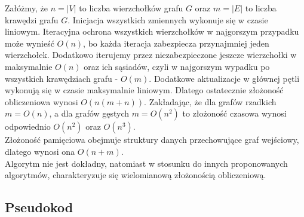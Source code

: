     Załóżmy, że $n = |V|$ to liczba wierzchołków grafu $G$ oraz $m = |E|$ to liczba krawędzi grafu $G$. 
    Inicjacja wszystkich zmiennych wykonuje się w czasie liniowym. Iteracyjna ochrona wszystkich wierzchołków w najgorszym przypadku może wynieść $O(n)$, bo każda iteracja zabezpiecza przynajmniej jeden wierzchołek. Dodatkowo iterujemy przez niezabezpieczone jeszcze wierzchołki w maksymalnie $O(n)$ oraz ich sąsiadów, czyli w najgorszym wypadku po wszystkich krawędziach grafu - $O(m)$. Dodatkowe aktualizacje w głównej pętli wykonują się w czasie maksymalnie liniowym. Dlatego ostatecznie złożoność obliczeniowa wynosi $O(n(m+n))$. Zakładając, że dla grafów rzadkich $m=O(n)$, a dla grafów gęstych $m=O(n^2)$ to złożoność czasowa wynosi odpowiednio $O(n^2)$ oraz $O(n^3)$.\\
    Złożoność pamięciowa obejmuje struktury danych przechowujące graf wejściowy, dlatego wynosi ona $O(n+m)$.\\
    Algorytm nie jest dokładny, natomiast w stosunku do innych proponowanych algorytmów, charakteryzuje się wielomianową złożonością obliczeniową.
    
    \subsection{Pseudokod}

